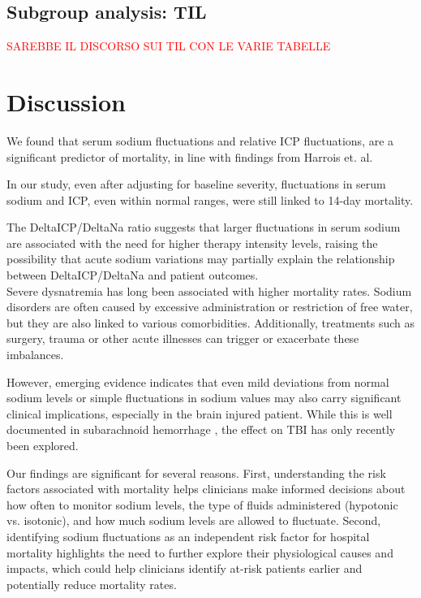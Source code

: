 \subsection{Subgroup analysis: TIL}
\textcolor{red}{SAREBBE IL DISCORSO SUI TIL CON LE VARIE TABELLE}


\section{Discussion}
We found that  serum sodium fluctuations and relative ICP fluctuations, are a significant predictor of mortality, in line with findings from Harrois et. al.\cite{harroisVariabilitySerumSodium2021a}

In our study, even after adjusting for baseline severity, fluctuations in serum sodium and ICP, even within normal ranges, were still linked to 14-day mortality.

The DeltaICP/DeltaNa ratio suggests that larger fluctuations in serum sodium are associated with the need for higher therapy intensity levels, raising the possibility that acute sodium variations may partially explain the relationship between DeltaICP/DeltaNa and patient outcomes.\\

Severe dysnatremia has long been associated with higher mortality rates. Sodium disorders are often caused by excessive administration or restriction of free water, but they are also linked to various comorbidities. Additionally, treatments such as surgery\cite{marshallAssociationSodiumFluctuations2017}\cite{sakrFluctuationsSerumSodium2013}, trauma or other acute illnesses\cite{senSodiumVariabilityAssociated2017a} can trigger or exacerbate these imbalances.

However, emerging evidence\cite{darmonPrognosticConsequencesBorderline2013} indicates that even mild deviations from normal sodium levels or simple fluctuations in sodium values may also carry significant clinical implications, especially in the brain injured patient. While this is well documented in subarachnoid hemorrhage \cite{jinAssociationSerumSodium2022}\cite{labibSodiumItsImpact2024}\cite{balesEffectHyponatremiaSodium2016}\cite{topjianGreaterFluctuationsSerum2014}\cite{eaglesSignificanceFluctuationsSerum2019}\cite{haradaImpactHormonalDynamics2022}, the effect on TBI has only recently been explored\cite{harroisVariabilitySerumSodium2021a}.

Our findings are significant for several reasons. First, understanding the risk factors associated with mortality helps clinicians make informed decisions about how often to monitor sodium levels, the type of fluids administered (hypotonic vs. isotonic), and how much sodium levels are allowed to fluctuate. Second, identifying sodium fluctuations as an independent risk factor for hospital mortality highlights the need to further explore their physiological causes and impacts, which could help clinicians identify at-risk patients earlier and potentially reduce mortality rates.

